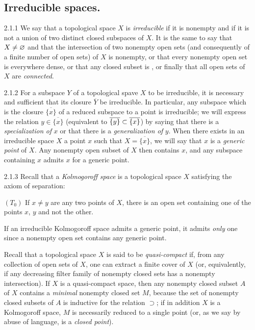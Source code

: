 \documentclass[../main.tex]{subfiles}
\begin{document}
\subsection{Irreducible spaces.}

\begin{cx}{2.1.1}
We say that a topological space $X$ is \emph{irreducible} if it is nonempty and
if it is not a union of two distinct closed subspaces of $X$. It is the same to say
that $X\neq\varnothing$ and that the intersection of two nonempty open sets (and consequently
of a finite number of open sets) of $X$ is nonempty, or that every nonempty open set
is everywhere dense, or that any closed subset is , or finally
that all open sets of $X$ are \emph{connected}.
\end{cx}

\begin{cx}{2.1.2}
For a subspace $Y$ of a topological spave $X$ to be irreducible, it is necessary and
sufficient that its closure $\overline{Y}$ be irreducible. In particular, any subspace
which is the closure $\overline{\{x\}}$ of a reduced subspace to a point is irreducible;
we will express the relation $y\in\overline{\{x\}}$ (equivalent to
$\overline{\{y\}}\subset\overline{\{x\}}$) by saying that there is a \emph{specialization of}
$x$ or that there is a \emph{generalization of} $y$. When there exists in an irreducible
space $X$ a point $x$ such that $X=\overline{\{x\}}$, we will say that $x$ is a
\emph{generic point} of $X$. Any nonempty open subset of $X$ then contains $x$, and any
subspace containing $x$ admits $x$ for a generic point.
\end{cx}

\begin{cx}{2.1.3}
Recall that a \emph{Kolmogoroff space} is a topological space $X$ satisfying the axiom
of separation:

$(T_0)$ If $x\neq y$ are any two points of $X$, there is an open set containing one of
the points $x$, $y$ and not the other.

If an irreducible Kolmogoroff space admits a generic point, it admits \emph{only} one
since a nonempty open set contains any generic point.

Recall that a topological space $X$ is said to be \emph{quasi-compact} if, from any
collection of open sets of $X$, one can extract a finite cover of $X$ (or, equivalently,
if any decreasing filter family of nonempty closed sets has a nonempty intersection). If
$X$ is a quasi-compact space, then any nonempty closed subset $A$ of $X$ contains a \emph{minimal}
nonempty closed set $M$, because the set of nonempty closed subsets of $A$ is inductive for
the relation $\supset$; if in addition $X$ is a Kolmogoroff space, $M$ is necessarily reduced
to a single point (or, as we say by abuse of language, is a \emph{closed point}).
\end{cx}
\end{document}

